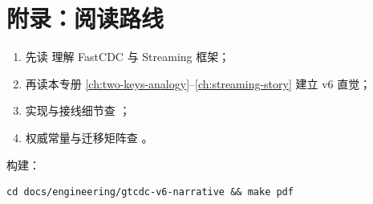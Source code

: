 \chapter{附录：阅读路线}

\begin{enumerate}
  \item 先读  理解 FastCDC 与 Streaming 框架；
  \item 再读本专册 \cref{ch:two-keys-analogy}--\cref{ch:streaming-story} 建立 v6 直觉；
  \item 实现与接线细节查 ；
  \item 权威常量与迁移矩阵查 。
\end{enumerate}

构建：
\begin{verbatim}
cd docs/engineering/gtcdc-v6-narrative && make pdf
\end{verbatim}
